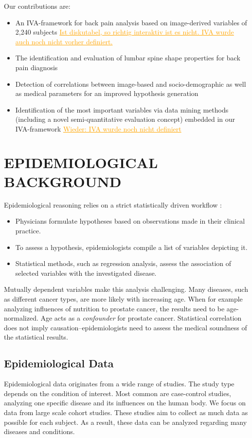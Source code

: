 \documentclass[a4paper,twoside]{style/article}
\newcommand{\com}[1]{\textcolor{orange}{\uline{#1}}}
\begin{document}
Our contributions are:
\begin{itemize}
\item An IVA-framework for back pain analysis based on image-derived variables of 2,240 subjects \com{Ist diskutabel, so richtig interaktiv ist es nicht. IVA wurde auch noch nicht vorher definiert.}
\item The identification and evaluation of lumbar spine shape properties for back pain diagnosis
\item Detection of correlations between image-based and socio-demographic as well as medical parameters for an improved hypothesis generation
\item Identification of the most important variables via data mining methods (including a novel semi-quantitative evaluation concept) embedded in our IVA-framework \com{Wieder: IVA wurde noch nicht definiert}
\end{itemize}
\section{\uppercase{Epidemiological Background}}
\label{sec:EpidemiologicalBackground}
\noindent Epidemiological reasoning relies on a strict statistically driven workflow \cite{Fletcher}:
\begin{itemize}
	\item Physicians formulate hypotheses based on observations made in their clinical practice.
	\item To assess a hypothesis, epidemiologists compile a list of variables depicting it.
	\item Statistical methods, such as regression analysis, assess the association of selected variables with the investigated disease.
\end{itemize}
Mutually dependent variables make this analysis challenging.
Many diseases, such as different cancer types, are more likely with increasing age.
When for example analyzing influences of nutrition to prostate cancer, the results need to be age-normalized.
Age acts as a \emph{confounder} for prostate cancer.
Statistical correlation does not imply causation--epidemiologists need to assess the medical soundness of the statistical results.
\subsection{Epidemiological Data}
Epidemiological data originates from a wide range of studies.
The study type depends on the condition of interest.
Most common are case-control studies, analyzing one specific disease and its influences on the human body.
We focus on data from large scale cohort studies.
These studies aim to collect as much data as possible for each subject.
As a result, these data can be analyzed regarding many diseases and conditions.
\end{document}
